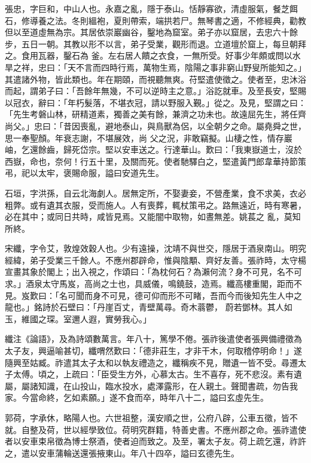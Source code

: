 \begin{pinyinscope}
 張忠，字巨和，中山人也。永嘉之亂，隱于泰山。恬靜寡欲，清虛服氣，餐芝餌石，修導養之法。冬則縕袍，夏則帶索，端拱若尸。無琴書之適，不修經典，勸教但以至道虛無為宗。其居依崇巖幽谷，鑿地為窟室。弟子亦以窟居，去忠六十餘步，五日一朝。其教以形不以言，弟子受業，觀形而退。立道壇於窟上，每旦朝拜之。食用瓦器，鑿石為
 釜。左右居人饋之衣食，一無所受。好事少年頗或問以水旱之祥，忠曰：「天不言而四時行焉，萬物生焉，陰陽之事非窮山野叟所能知之。」其遣諸外物，皆此類也。年在期頤，而視聽無爽。苻堅遣使徵之。使者至，忠沐浴而起，謂弟子曰：「吾餘年無幾，不可以逆時主之意。」浴訖就車。及至長安，堅賜以冠衣，辭曰：「年朽髮落，不堪衣冠，請以野服入覲。」從之。及見，堅謂之曰：「先生考磐山林，研精道素，獨善之美有餘，兼濟之功未也。故遠屈先生，將任齊尚父。」忠曰：「昔因喪亂，避地泰山，與鳥獸為侶，以全朝夕之命。屬堯舜之世，思一奉聖顏。年衰志謝，不堪展效，尚
 父之況，非敢竊擬。山棲之性，情存巖岫，乞還餘齒，歸死岱宗。堅以安車送之。行達華山。歎曰：「我東嶽道士，沒於西嶽，命也，奈何！行五十里，及關而死。使者馳驛白之，堅遣黃門郎韋華持節策弔，祀以太牢，褒賜命服，謚曰安道先生。



 石垣，字洪孫，自云北海劇人。居無定所，不娶妻妾，不營產業，食不求美，衣必粗弊。或有遺其衣服，受而施人。人有喪葬，輒杖策弔之。路無遠近，時有寒暑，必在其中；或同日共時，咸皆見焉。又能闇中取物，如晝無差。姚萇之
 亂，莫知所終。



 宋纖，字令艾，敦煌效穀人也。少有遠操，沈靖不與世交，隱居于酒泉南山。明究經緯，弟子受業三千餘人。不應州郡辟命，惟與陰顒、齊好友善。張祚時，太守楊宣畫其象於閣上；出入視之，作頌曰：「為枕何石？為瀨何流？身不可見，名不可求。」酒泉太守馬岌，高尚之士也，具威儀，鳴鐃鼓，造焉。纖高樓重閣，距而不見。岌歎曰：「名可聞而身不可見，德可仰而形不可睹，吾而今而後知先生人中之龍也。」銘詩於石壁曰：「丹崖百丈，青壁萬尋。奇木蓊鬱，
 蔚若鄧林。其人如玉，維國之琛。室邇人遐，實勞我心。」



 纖注《論語》，及為詩頌數萬言。年八十，篤學不倦。張祚後遣使者張興備禮徵為太子友，興逼喻甚切，纖喟然歎曰：「德非莊生，才非干木，何取稽停明命！」遂隨興至姑臧。祚遣其太子太和以執友禮造之，纖稱疾不見，贈遺一皆不受。尋遷太子太傅。頃之，上疏曰：「臣受生方外，心慕太古。生不喜存，死不悲沒。素有遺屬，屬諸知識，在山投山，臨水投水，處澤露形，在人親土。聲聞書疏，勿告我家。今當命終，乞如素願。」遂不食而卒，時年八十二，謚曰玄虛先生。



 郭荷，字承休，略陽人也。六世祖整，漢安順之世，公府八辟，公車五徵，皆不就。自整及荷，世以經學致位。荷明究群籍，特善史書。不應州郡之命。張祚遣使者以安車束帛徵為博士祭酒，使者迫而致之。及至，署太子友。荷上疏乞還，祚許之，遣以安車蒲輪送還張掖東山。年八十四卒，謚曰玄德先生。




\end{pinyinscope}
